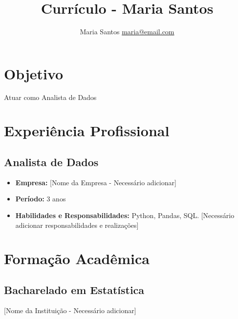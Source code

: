 \documentclass{article}
\title{Currículo - Maria Santos}
\author{Maria Santos \href{mailto:maria@email.com}{maria@email.com}}
\date{}
\begin{document}
\maketitle

\section{Objetivo}
\noindent Atuar como Analista de Dados

\section{Experiência Profissional}
\subsection{Analista de Dados}
\begin{itemize}
    \item \textbf{Empresa:} [Nome da Empresa - Necessário adicionar]\\ 
    \item \textbf{Período:} 3 anos\\ 
    \item \textbf{Habilidades e Responsabilidades:} Python, Pandas, SQL. [Necessário adicionar responsabilidades e realizações] 
\end{itemize}

\section{Formação Acadêmica}
\subsection{Bacharelado em Estatística}
[Nome da Instituição - Necessário adicionar]
\end{document}
